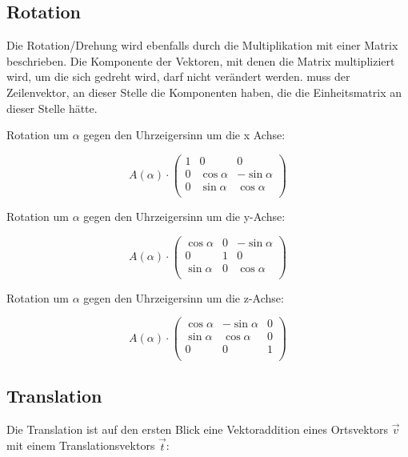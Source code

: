 \subsection{Rotation}

Die Rotation/Drehung wird ebenfalls durch die Multiplikation mit einer Matrix beschrieben. Die Komponente der Vektoren, mit denen die Matrix multipliziert wird, um die sich gedreht wird, darf nicht verändert werden. muss der Zeilenvektor, an dieser Stelle die Komponenten haben, die die Einheitsmatrix an dieser Stelle hätte.

Rotation um $\alpha$ gegen den Uhrzeigersinn um die x Achse:

\[
    A(\alpha)
    \cdot
    \begin{pmatrix}
        1 & 0          & 0           \\
        0 & \cos\alpha & -\sin\alpha \\
        0 & \sin\alpha & \cos\alpha  \\
    \end{pmatrix}
\]

Rotation um $\alpha$ gegen den Uhrzeigersinn um  die y-Achse:

\[
    A(\alpha)
    \cdot
    \begin{pmatrix}
        \cos\alpha & 0 & -\sin\alpha \\
        0          & 1 & 0           \\
        \sin\alpha & 0 & \cos\alpha  \\
    \end{pmatrix}
\]

Rotation um $\alpha$ gegen den Uhrzeigersinn um  die z-Achse:

\[
    A(\alpha)
    \cdot
    \begin{pmatrix}
        \cos\alpha & -\sin\alpha & 0 \\
        \sin\alpha & \cos\alpha  & 0 \\
        0          & 0           & 1 \\
    \end{pmatrix}
\]

\subsection{Translation}

Die Translation ist auf den ersten Blick eine Vektoraddition eines Ortsvektors $\vec{v}$ mit einem Translationsvektors $\vec{t}$:

